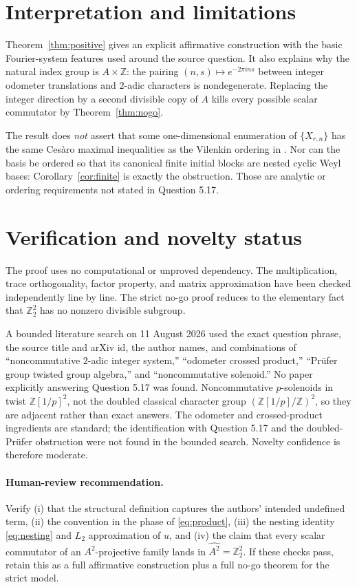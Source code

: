 \documentclass[11pt]{article}
\theoremstyle{definition}
\theoremstyle{remark}
\newcommand{\Z}{\mathbb Z}
\newcommand{\1}{\mathbf 1}
\begin{document}
\section{Interpretation and limitations}

Theorem~\ref{thm:positive} gives an explicit affirmative construction with
the basic Fourier-system features used around the source question.  It also
explains why the natural index group is $A\times\Z$: the pairing
$(n,s)\mapsto e^{-2\pi ins}$ between integer odometer translations and
$2$-adic characters is nondegenerate.  Replacing the integer direction by a
second divisible copy of $A$ kills every possible scalar commutator by
Theorem~\ref{thm:nogo}.

The result does \emph{not} assert that some one-dimensional enumeration of
$\{X_{r,n}\}$ has the same Ces\`aro maximal inequalities as the Vilenkin
ordering in \cite{JLZZ}.  Nor can the basis be ordered so that its canonical
finite initial blocks are nested cyclic Weyl bases: Corollary~\ref{cor:finite}
is exactly the obstruction.  Those are analytic or ordering requirements not
stated in Question 5.17.

\section{Verification and novelty status}

The proof uses no computational or unproved dependency.  The multiplication,
trace orthogonality, factor property, and matrix approximation have been
checked independently line by line.  The strict no-go proof reduces to the
elementary fact that $\Z_2^2$ has no nonzero divisible subgroup.

A bounded literature search on 11 August 2026 used the exact question phrase,
the source title and arXiv id, the author names, and combinations of
``noncommutative $2$-adic integer system,'' ``odometer crossed product,''
``Pr\"ufer group twisted group algebra,'' and ``noncommutative solenoid.''  No
paper explicitly answering Question 5.17 was found.  Noncommutative
$p$-solenoids in \cite{LP11,LP13} twist $\Z[1/p]^2$, not the doubled classical
character group $(\Z[1/p]/\Z)^2$, so they are adjacent rather than exact
answers.  The odometer and crossed-product ingredients are standard; the
identification with Question 5.17 and the doubled-Pr\"ufer obstruction were
not found in the bounded search.  Novelty confidence is therefore moderate.

\paragraph{Human-review recommendation.}
Verify (i) that the structural definition captures the authors' intended
undefined term, (ii) the convention in the phase of \eqref{eq:product},
(iii) the nesting identity \eqref{eq:nesting} and $L_2$ approximation of $u$,
and (iv) the claim that every scalar commutator of an $A^2$-projective family
lands in $\widehat{A^2}=\Z_2^2$.  If these checks pass, retain this as a full
affirmative construction plus a full no-go theorem for the strict model.
\end{document}

